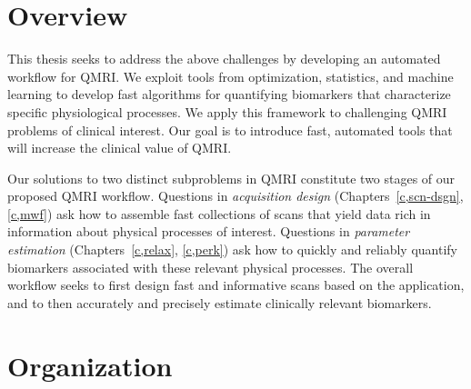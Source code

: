 \section{Overview}
\label{s,intro,over}

This thesis seeks
to address the above challenges
by developing an automated workflow for QMRI.
We exploit tools
from optimization, statistics, and machine learning
to develop fast algorithms
for quantifying biomarkers
that characterize specific physiological processes. 
We apply this framework
to challenging QMRI problems 
of clinical interest.
Our goal is to introduce fast, automated tools
that will increase the clinical value of QMRI.

Our solutions to two distinct subproblems in QMRI
constitute two stages of our proposed QMRI workflow.
Questions in \emph{acquisition design}
(Chapters~\ref{c,scn-dsgn}, \ref{c,mwf})
ask how to assemble 
fast collections of scans
that yield data 
rich in information 
about physical processes of interest.
Questions in \emph{parameter estimation}
(Chapters~\ref{c,relax}, \ref{c,perk})
ask how to quickly and reliably quantify biomarkers 
associated with these relevant physical processes.
The overall workflow seeks to
first design fast and informative scans 
based on the application,
and to then accurately and precisely estimate 
clinically relevant biomarkers.
 
\section{Organization}
\label{s,intro,org}


